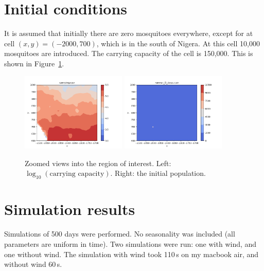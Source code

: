 \documentclass{article}
\begin{document}
\section{Initial conditions}

It is assumed that initially there are zero mosquitoes everywhere, except for at cell $(x, y) = (-2000, 700)$, which is in the south of Nigera.  At this cell 10,000 mosquitoes are introduced.  The carrying capacity of the cell is 150,000.  This is shown in Figure~\ref{zoom_0.fig}.

\begin{figure}[htb]
  \centering
  \includegraphics[width=5cm]{carrying_zoom.png} \quad
  \includegraphics[width=5cm]{runner_0_days.png}
  \caption{\label{zoom_0.fig}Zoomed views into the region of interest.  Left: $\log_{10}(\mbox{carrying capacity})$.  Right: the initial population.}
\end{figure}

\section{Simulation results}

Simulations of 500 days were performed.  No seasonality was included (all parameters are uniform in time).  Two simulations were run: one with wind, and one without wind.  The simulation with wind took 110\,s on my macbook air, and without wind 60\,s.
\end{document}
